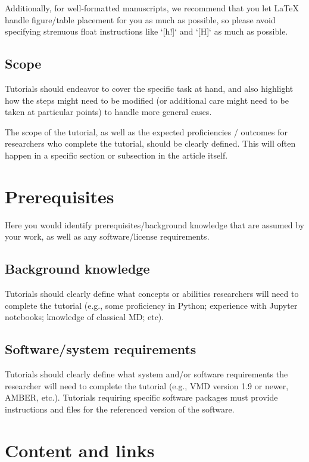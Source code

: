 \documentclass[9pt,tutorial]{livecoms}
\begin{document}
Additionally, for well-formatted manuscripts, we recommend that you let LaTeX handle figure/table placement for you as much as possible, so please avoid specifying strenuous float instructions like `[h!]` and `[H]` as much as possible.

\subsection{Scope}

Tutorials should endeavor to cover the specific task at hand, and also highlight how the steps might need to be modified (or additional care might need to be taken at particular points) to handle more general cases.

The scope of the tutorial, as well as the expected proficiencies / outcomes for researchers who complete the tutorial, should be clearly defined.
This will often happen in a specific section or subsection in the article itself.

\section{Prerequisites}

Here you would identify prerequisites/background knowledge that are assumed by your work, as well as any software/license requirements.

\subsection{Background knowledge}
Tutorials should clearly define what concepts or abilities researchers will need to complete the tutorial (e.g., some proficiency in Python; experience with Jupyter notebooks; knowledge of classical MD; etc).

\subsection{Software/system requirements}
Tutorials should clearly define what system and/or software requirements the researcher will need to complete the tutorial (e.g., VMD version 1.9 or newer, AMBER, etc.). Tutorials requiring specific software packages must provide instructions and files for the referenced version of the software.

\section{Content and links}
\end{document}
